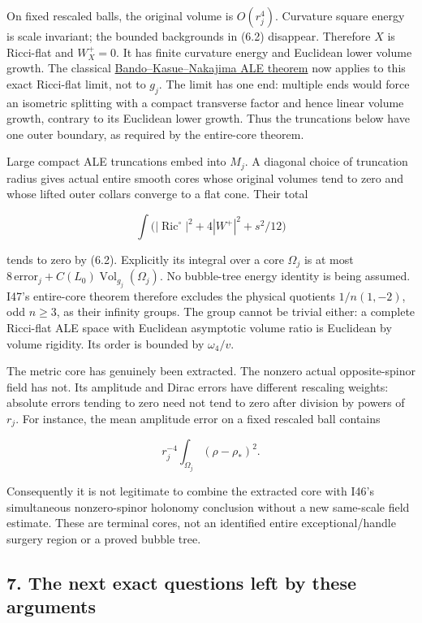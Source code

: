 \documentclass[
  10pt,
]{article}
\begin{document}
On fixed rescaled balls, the original volume is \(O(r_j^4)\). Curvature
square energy is scale invariant; the bounded backgrounds in (6.2)
disappear. Therefore \(X\) is Ricci-flat and \(W_X^+=0\). It has finite
curvature energy and Euclidean lower volume growth. The classical
\href{https://doi.org/10.1007/BF01389045}{Bando--Kasue--Nakajima ALE
theorem} now applies to this exact Ricci-flat limit, not to \(g_j\). The
limit has one end: multiple ends would force an isometric splitting with
a compact transverse factor and hence linear volume growth, contrary to
its Euclidean lower growth. Thus the truncations below have one outer
boundary, as required by the entire-core theorem.

Large compact ALE truncations embed into \(M_j\). A diagonal choice of
truncation radius gives actual entire smooth cores whose original
volumes tend to zero and whose lifted outer collars converge to a flat
cone. Their total

\[
 \int\bigl(|\operatorname{Ric}^{\circ}|^2+4|W^+|^2+s^2/12\bigr)
                                                               \tag{6.3}
\]

tends to zero by (6.2). Explicitly its integral over a core \(\Omega_j\)
is at most
\(8\,\mathrm{error}_j+C(L_0)\operatorname{Vol}_{g_j}(\Omega_j)\). No
bubble-tree energy identity is being assumed. I47's entire-core theorem
therefore excludes the physical quotients \(1/n(1,-2)\), odd \(n\ge3\),
as their infinity groups. The group cannot be trivial either: a complete
Ricci-flat ALE space with Euclidean asymptotic volume ratio is Euclidean
by volume rigidity. Its order is bounded by \(\omega_4/v\).

The metric core has genuinely been extracted. The nonzero actual
opposite-spinor field has not. Its amplitude and Dirac errors have
different rescaling weights: absolute errors tending to zero need not
tend to zero after division by powers of \(r_j\). For instance, the mean
amplitude error on a fixed rescaled ball contains

\[
                      r_j^{-4}\int_{\Omega_j}(\rho-\rho_*)^2.
\]

Consequently it is not legitimate to combine the extracted core with
I46's simultaneous nonzero-spinor holonomy conclusion without a new
same-scale field estimate. These are terminal cores, not an identified
entire exceptional/handle surgery region or a proved bubble tree.

\hypertarget{the-next-exact-questions-left-by-these-arguments}{%
\subsection{7. The next exact questions left by these
arguments}\label{the-next-exact-questions-left-by-these-arguments}}
\end{document}

